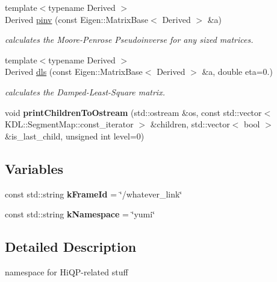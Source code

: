 \begin{DoxyCompactItemize}
\item 
{\footnotesize template$<$typename Derived $>$ }\\Derived \hyperlink{namespacehiqp_a5762e31938369b2fdbd81ac2bd11ca0f}{pinv} (const Eigen\-::\-Matrix\-Base$<$ Derived $>$ \&a)
\begin{DoxyCompactList}\small\item\em calculates the Moore-\/\-Penrose Pseudoinverse for any sized matrices. \end{DoxyCompactList}\item 
{\footnotesize template$<$typename Derived $>$ }\\Derived \hyperlink{namespacehiqp_a8fb181f069898cddd461b0a33f2f19d1}{dls} (const Eigen\-::\-Matrix\-Base$<$ Derived $>$ \&a, double eta=0.)
\begin{DoxyCompactList}\small\item\em calculates the Damped-\/\-Least-\/\-Square matrix. \end{DoxyCompactList}\item 
\hypertarget{namespacehiqp_a8c04766c4d507563fca71bb11f6beefe}{void {\bfseries print\-Children\-To\-Ostream} (std\-::ostream \&os, const std\-::vector$<$ K\-D\-L\-::\-Segment\-Map\-::const\-\_\-iterator $>$ \&children, std\-::vector$<$ bool $>$ \&is\-\_\-last\-\_\-child, unsigned int level=0)}\label{namespacehiqp_a8c04766c4d507563fca71bb11f6beefe}

\end{DoxyCompactItemize}
\subsection*{Variables}
\begin{DoxyCompactItemize}
\item 
\hypertarget{namespacehiqp_a708c3707ff0581f307cae48cbdcd8095}{const std\-::string {\bfseries k\-Frame\-Id} = \char`\"{}/whatever\-\_\-link\char`\"{}}\label{namespacehiqp_a708c3707ff0581f307cae48cbdcd8095}

\item 
\hypertarget{namespacehiqp_aebad6d5340f6b783e11d5aa7d056f744}{const std\-::string {\bfseries k\-Namespace} = \char`\"{}yumi\char`\"{}}\label{namespacehiqp_aebad6d5340f6b783e11d5aa7d056f744}

\end{DoxyCompactItemize}


\subsection{Detailed Description}
namespace for Hi\-Q\-P-\/related stuff 

